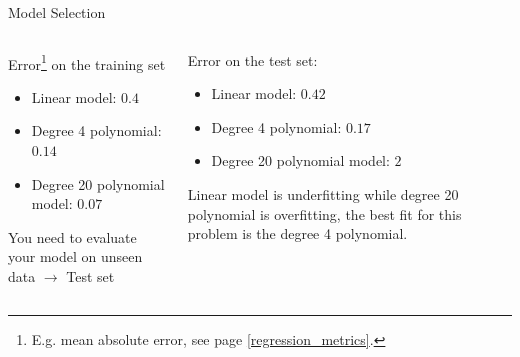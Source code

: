 \begin{frame} {Model Selection}
  \begin{columns}
    \begin{column}{0.5\textwidth}
    Error\footnote{E.g. mean absolute error, see page \ref{regression_metrics}.} on the \alert{training set}
      \begin{itemize}
    \item Linear model: $0.4$
    \item Degree 4 polynomial: $0.14$
    \item Degree 20 polynomial model: $0.07$
  \end{itemize}
  \vspace{1cm}
  You need to evaluate your model on unseen data $\rightarrow$  \alert{Test set}
\end{column}
\pause
\begin{column}{0.5\textwidth}
  Error on the test set: 
  \begin{itemize}
    \item Linear model: $0.42$
    \item Degree 4 polynomial: $0.17$
    \item Degree 20 polynomial model: $2$
  \end{itemize}
  \vspace{1cm}
  Linear model is \alert{underfitting} while degree 20 polynomial is \alert{overfitting}, the best fit for this problem is the degree 4 polynomial. 
\end{column}
\end{columns}
\end{frame}


